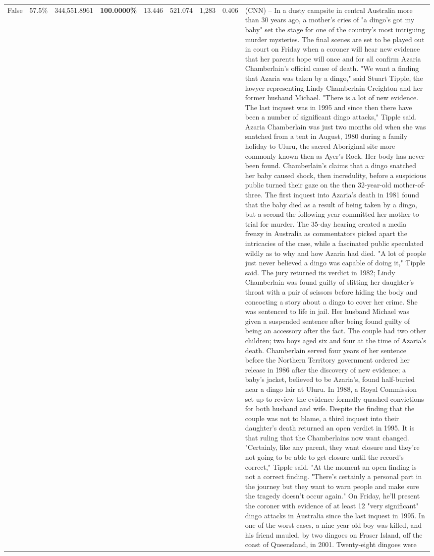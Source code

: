\begin{table}[H]
\begin{tabular}{lllrlllll}
False & 57.5\% & 344,551.8961 & \bfseries \color{red} 100.0000\% & 13.446 & 521.074 & 1,283 & 0.406 & (CNN) -- In a dusty campsite in central Australia more than 30 years ago, a mother's cries of "a dingo's got my baby" set the stage for one of the country's most intriguing murder mysteries. The final scenes are set to be played out in court on Friday when a coroner will hear new evidence that her parents hope will once and for all confirm Azaria Chamberlain's official cause of death. "We want a finding that Azaria was taken by a dingo," said Stuart Tipple, the lawyer representing Lindy Chamberlain-Creighton and her former husband Michael. "There is a lot of new evidence. The last inquest was in 1995 and since then there have been a number of significant dingo attacks," Tipple said. Azaria Chamberlain was just two months old when she was snatched from a tent in August, 1980 during a family holiday to Uluru, the sacred Aboriginal site more commonly known then as Ayer's Rock. Her body has never been found. Chamberlain's claims that a dingo snatched her baby caused shock, then incredulity, before a suspicious public turned their gaze on the then 32-year-old mother-of-three. The first inquest into Azaria's death in 1981 found that the baby died as a result of being taken by a dingo, but a second the following year committed her mother to trial for murder. The 35-day hearing created a media frenzy in Australia as commentators picked apart the intricacies of the case, while a fascinated public speculated wildly as to why and how Azaria had died. "A lot of people just never believed a dingo was capable of doing it," Tipple said. The jury returned its verdict in 1982; Lindy Chamberlain was found guilty of slitting her daughter's throat with a pair of scissors before hiding the body and concocting a story about a dingo to cover her crime. She was sentenced to life in jail. Her husband Michael was given a suspended sentence after being found guilty of being an accessory after the fact. The couple had two other children; two boys aged six and four at the time of Azaria's death. Chamberlain served four years of her sentence before the Northern Territory government ordered her release in 1986 after the discovery of new evidence; a baby's jacket, believed to be Azaria's, found half-buried near a dingo lair at Uluru. In 1988, a Royal Commission set up to review the evidence formally quashed convictions for both husband and wife. Despite the finding that the couple was not to blame, a third inquest into their daughter's death returned an open verdict in 1995. It is that ruling that the Chamberlains now want changed. "Certainly, like any parent, they want closure and they're not going to be able to get closure until the record's correct," Tipple said. "At the moment an open finding is not a correct finding. "There's certainly a personal part in the journey but they want to warn people and make sure the tragedy doesn't occur again." On Friday, he'll present the coroner with evidence of at least 12 "very significant" dingo attacks in Australia since the last inquest in 1995. In one of the worst cases, a nine-year-old boy was killed, and his friend mauled, by two dingoes on Fraser Island, off the coast of Queensland, in 2001. Twenty-eight dingoes were 
\end{tabular}
\end{table}
